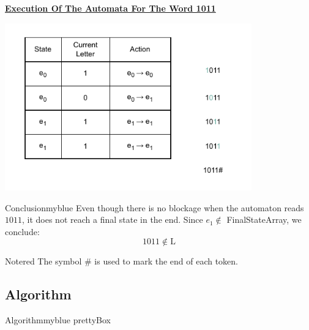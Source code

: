\vspace{0.4cm}
\textbf{\underline{Execution Of The Automata For The Word 1011}}\\[0.25cm]

\begin{center}
    \includegraphics[width=0.8\textwidth]{Chapters/Examples/Lexi/ex1.1.drawio.pdf}
\end{center}

\newpage
\null

\begin{prettyBox}{Conclusion}{myblue}
Even though there is no blockage when the automaton reads \(1011\),  
it does not reach a final state in the end. Since \( e_1 \notin \) FinalStateArray, we conclude:  
\[ \boxed{1011 \notin \text{L}} \]
\end{prettyBox}

\vspace{0.5cm}

\begin{prettyBox}{Note}{red}
The symbol \# is used to mark the end of each token.
\end{prettyBox}

\vspace{0.5cm}
\subsection{Algorithm}
\begin{prettyBox}{Algorithm}{myblue}
    prettyBox
\end{prettyBox}

